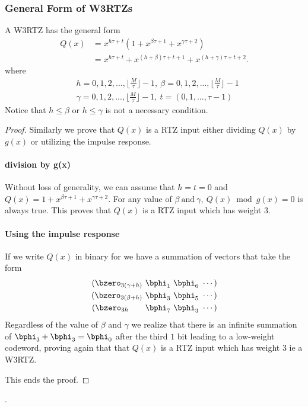 \subsubsection{General Form of W3RTZs}
A W3RTZ has the general form
\begin{equation}
\begin{split}
Q(x) &=x^{h\tau+t}(1+x^{\beta \tau +1}+x^{\gamma \tau +2})\\
&=x^{h\tau+t}+x^{(h+\beta) \tau +t+1}+x^{(h+\gamma) \tau +t+2}. 
\end{split}
\end{equation}
where
\begin{equation*}
\begin{split}
&h=0,1,2,...,\Big \lfloor \frac{M}{\tau} \Big\rfloor-1,~
\beta=0,1,2,...,\Big \lfloor \frac{M}{\tau} \Big\rfloor-1\\
&\gamma=0,1,2,...,\Big \lfloor \frac{M}{\tau} \Big\rfloor-1,~
 t=(0,1,...,\tau-1)
 \end{split}
 \end{equation*}
Notice that $h \leq \beta$ or $h \leq \gamma$ is not a necessary condition.
	
\begin{proof}
Similarly we prove that $Q(x)$ is a RTZ input either dividing $Q(x)$ by $g(x)$ or utilizing the impulse response. 
\paragraph{division by g(x)}
Without loss of generality, we can assume that $h=t=0$ and 
$Q(x) = 1+x^{\beta \tau +1}+x^{\gamma \tau +2}$.
For any value of $\beta~\text{and}~\gamma,~Q(x) \bmod g(x) = 0$ is always true. This proves that $Q(x)$ is a RTZ input which has weight $3$.

\paragraph{Using the impulse response}
If we write $Q(x)$ in binary for we have a summation of vectors that take the form
\begin{eqnarray*}
(\bzero_{3(\gamma+h)}~\bphi_1~\bphi_6~\cdots)\cr
(\bzero_{3(\beta+h)}~\bphi_3~\bphi_5~\cdots)\cr
(\bzero_{3 h}~~~~~~\bphi_7~\bphi_3~\cdots)
\end{eqnarray*}
Regardless of the value of $\beta$ and $\gamma$ we realize that there is an infinite summation of $\bphi_3+\bphi_3=\bphi_0$ after the third $1$ bit leading to a low-weight codeword, proving again that that $Q(x)$ is a RTZ input which has weight $3$ ie a W3RTZ.

This ends the proof.

\end{proof}.


